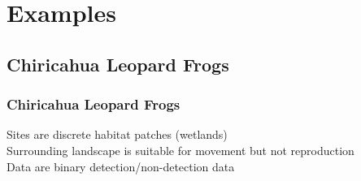 \documentclass[color=usenames,dvipsnames]{beamer}\usepackage[]{graphicx}\usepackage[]{color}
\begin{document}
\section{Examples}


\subsection{Chiricahua Leopard Frogs}

\begin{frame}
  \frametitle{Chiricahua Leopard Frogs}
  Sites are discrete habitat patches (wetlands) \\
  Surrounding landscape is suitable for movement but not reproduction \\
  Data are binary detection/non-detection data
  \begin{columns}
    \begin{column}{0.5\textwidth}
    \end{column}
    \begin{column}{0.5\textwidth}

\end{column}
\end{columns}
\end{frame}
\end{document}
